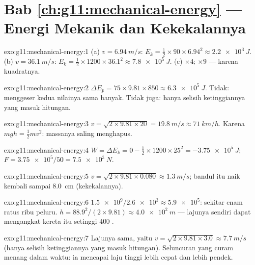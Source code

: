 \section*{Bab \ref{ch:g11:mechanical-energy} --- Energi Mekanik dan Kekekalannya}

\begin{solution}{exo:g11:mechanical-energy:1}
(a) $v = \qty{6.94}{m/s}$:
$E_k = \tfrac12 \times 90 \times 6.94^2 \approx \qty{2.2e3}{J}$.
(b) $v = \qty{36.1}{m/s}$:
$E_k = \tfrac12 \times 1200 \times 36.1^2 \approx \qty{7.8e5}{J}$.
(c) $\times 4$; $\times 9$ --- karena kuadratnya.
\end{solution}

\begin{solution}{exo:g11:mechanical-energy:2}
$\Delta E_p = 75 \times 9.81 \times 850 \approx \qty{6.3e5}{J}$. Tidak:
 menggeser kedua nilainya sama banyak. Tidak juga: hanya
selisih ketinggiannya yang masuk hitungan.
\end{solution}

\begin{solution}{exo:g11:mechanical-energy:3}
$v = \sqrt{2 \times 9.81 \times 20} = \qty{19.8}{m/s} \approx
\qty{71}{km/h}$. Karena $mgh = \tfrac12 mv^2$: massanya saling
menghapus.
\end{solution}

\begin{solution}{exo:g11:mechanical-energy:4}
$W = \Delta E_k = 0 - \tfrac12 \times 1200 \times 25^2 =
\qty{-3.75e5}{J}$; $F = \num{3.75e5}/50 = \qty{7.5e3}{N}$.
\end{solution}

\begin{solution}{exo:g11:mechanical-energy:5}
$v = \sqrt{2 \times 9.81 \times 0.080} \approx \qty{1.3}{m/s}$; bandul
itu naik kembali sampai \qty{8.0}{cm} (kekekalannya).
\end{solution}

\begin{solution}{exo:g11:mechanical-energy:6}
$\num{1.5e9}/\num{2.6e3} \approx \num{5.9e5}$: sekitar enam ratus ribu
peluru. $h = 88.9^2/(2 \times 9.81) \approx \qty{4.0e2}{m}$ --- lajunya
sendiri dapat mengangkat kereta itu setinggi $400$ .
\end{solution}

\begin{solution}{exo:g11:mechanical-energy:7}
Lajunya sama, yaitu
$v = \sqrt{2 \times 9.81 \times 3.0} \approx \qty{7.7}{m/s}$ (hanya
selisih ketinggiannya yang masuk hitungan). Seluncuran yang curam
menang dalam waktu: ia mencapai laju tinggi lebih cepat dan 
lebih pendek.
\end{solution}

